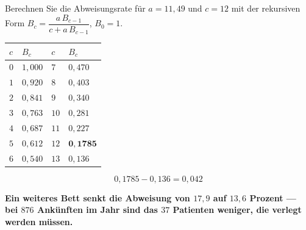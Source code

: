 \begin{aufgabe}
Berechnen Sie die Abweisungsrate für $a = 11{,}49$ und $c = 12$ mit der rekursiven Form $B_c = \dfrac{a\,B_{c-1}}{c + a\,B_{c-1}}$, $B_0 = 1$.

\loesung
{}
\begin{center}
{\small
\renewcommand{\arraystretch}{1.4}
\begin{tabular}{@{}P{1.2cm}P{2.0cm}P{1.2cm}P{2.0cm}@{}}
\toprule
$c$ & $B_c$ & $c$ & $B_c$\\
\midrule
$0$ & $1{,}000$ & $7$ & $0{,}470$\\
$1$ & $0{,}920$ & $8$ & $0{,}403$\\
$2$ & $0{,}841$ & $9$ & $0{,}340$\\
$3$ & $0{,}763$ & $10$ & $0{,}281$\\
$4$ & $0{,}687$ & $11$ & $0{,}227$\\
$5$ & $0{,}612$ & $12$ & $\mathbf{0{,}1785}$\\
$6$ & $0{,}540$ & $13$ & $0{,}136$\\
\bottomrule
\end{tabular}}
\end{center}

\[ 0{,}1785 - 0{,}136 = 0{,}042 \]

\begin{center}
\begin{minipage}{0.9\textwidth}
\textbf{Ein weiteres Bett senkt die Abweisung von $17{,}9$ auf $13{,}6$ Prozent --- bei $876$ Ankünften im Jahr sind das $37$ Patienten weniger, die verlegt werden müssen.}
\end{minipage}
\end{center}

\begin{center}
\begin{minipage}{0.88\textwidth}
\end{minipage}
\end{center}
\end{aufgabe}

